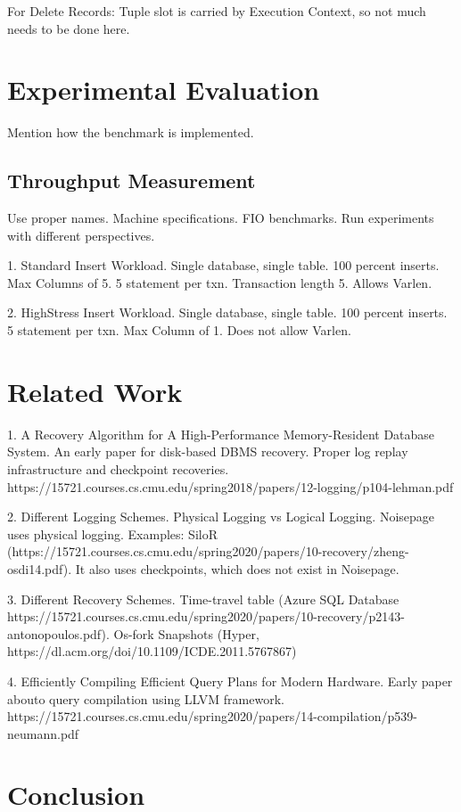 \documentclass[12pt]{cmuthesis}
\begin{document}
For Delete Records: Tuple slot is carried by Execution Context, so not much needs to be done here.
\chapter{Experimental Evaluation}
Mention how the benchmark is implemented.
\section{Throughput Measurement}
Use proper names. Machine specifications. FIO benchmarks. Run experiments with different perspectives.

1. Standard Insert Workload. Single database, single table. 100 percent inserts. Max Columns of 5. 5 statement per txn. Transaction length 5. Allows Varlen.

2. HighStress Insert Workload. Single database, single table. 100 percent inserts. 5 statement per txn. Max Column of 1. Does not allow Varlen.

\chapter{Related Work}
1. A Recovery Algorithm for A High-Performance Memory-Resident Database System. An early paper for disk-based DBMS recovery. Proper log replay infrastructure and checkpoint recoveries. https://15721.courses.cs.cmu.edu/spring2018/papers/12-logging/p104-lehman.pdf

2. Different Logging Schemes. Physical Logging vs Logical Logging. Noisepage uses physical logging. Examples: SiloR (https://15721.courses.cs.cmu.edu/spring2020/papers/10-recovery/zheng-osdi14.pdf). It also uses checkpoints, which does not exist in Noisepage.

3. Different Recovery Schemes. Time-travel table (Azure SQL Database https://15721.courses.cs.cmu.edu/spring2020/papers/10-recovery/p2143-antonopoulos.pdf). Os-fork Snapshots (Hyper, https://dl.acm.org/doi/10.1109/ICDE.2011.5767867)

4. Efficiently Compiling Efficient Query Plans
for Modern Hardware. Early paper abouto query compilation using LLVM framework. https://15721.courses.cs.cmu.edu/spring2020/papers/14-compilation/p539-neumann.pdf

\chapter{Conclusion}

%
\end{document}
